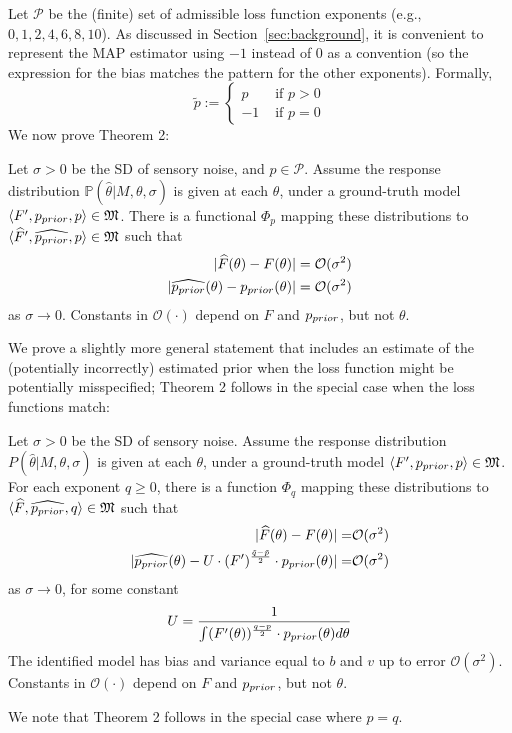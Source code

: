 Let $\mathcal{P}$ be the (finite) set of admissible loss function exponents (e.g., $0, 1, 2, 4, 6, 8, 10$).
As discussed in Section~\ref{sec:background}, it is convenient to represent the MAP estimator using $-1$ instead of $0$ as a convention (so the expression for the bias matches the pattern for the other exponents). Formally,
\begin{equation}\label{eq:tilde-p}
    \tilde{p} := \begin{cases} p &\text{ if } p > 0 \\ -1 & \text{ if } p=0\end{cases}
\end{equation}
We now prove Theorem 2:
\begin{thm}\label{thm:identifiability-well-specified}
Let $\sigma > 0$ be the SD of sensory noise, and $p \in \mathcal{P}$.
Assume the 
response distribution $\mathbb{P}(\widehat{\theta}|M,\theta, \sigma)$ is given at each $\theta$, under a ground-truth model $\langle F', p_{prior},p \rangle \in \mathfrak{M}$. 
There is a functional $\Phi_p$ mapping these distributions to $\langle \widehat{F}', \widehat{p_{prior}},p \rangle \in \mathfrak{M}$ such that 
\begin{align*}
|\widehat{F}(\theta) - F(\theta)| &= \mathcal{O}(\sigma^2) \\
|\widehat{p_{prior}}(\theta) - p_{prior}(\theta) | &= \mathcal{O}(\sigma^2) 
\end{align*}
as $\sigma \rightarrow 0$.
Constants in $\mathcal{O}(\cdot)$ depend on $F$ and $p_{prior}$, but not  $\theta$. 
\end{thm}
We prove a slightly more general statement that includes an estimate of the (potentially incorrectly) estimated prior when the loss function might be potentially misspecified; Theorem 2 follows in the special case when the loss functions match: 
\begin{thm}\label{thm:identifiability}
Let $\sigma > 0$ be the SD of sensory noise.
Assume the 
response distribution $P(\widehat{\theta}|M,\theta, \sigma)$ is given at each $\theta$, under a ground-truth model $\langle F', p_{prior},p \rangle \in \mathfrak{M}$. 
For each exponent $q \geq 0$, there is a function $\Phi_q$ mapping these distributions to $\langle \widehat{F}, \widehat{p_{prior}},q \rangle \in \mathfrak{M}$ such that 
\begin{align*}
|\widehat{F}(\theta) - F(\theta)| =& \mathcal{O}(\sigma^2) \\
|\widehat{p_{prior}}(\theta) - U \cdot (F')^{\frac{\tilde{q}-\tilde{p}}{2}} \cdot p_{prior}(\theta) | =& \mathcal{O}(\sigma^2) 
\end{align*}
as $\sigma \rightarrow 0$, for some constant
\begin{equation}
    U = \frac{1}{\int (F'(\theta))^{\frac{q-p}{2}} \cdot p_{prior}(\theta) d\theta }
\end{equation}
The identified model has bias and variance equal to $b$ and $v$ up to error $\mathcal{O}(\sigma^2)$.
Constants in $\mathcal{O}(\cdot)$ depend on $F$ and $p_{prior}$, but not  $\theta$. 
\end{thm}
We note that Theorem 2 follows in the special case where $p=q$.


